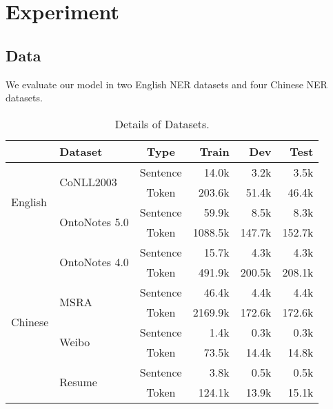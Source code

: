\documentclass[11pt,a4paper]{article}
\begin{document}
\section{Experiment}

\subsection{Data}

We evaluate our model in two English NER datasets and four Chinese NER datasets.

\begin{table}[t]\small \setlength{\tabcolsep}{2pt}
  \centering
\begin{threeparttable}
    \caption{Details of Datasets.} \label{tab:datasets_info}
    \begin{tabular}{llcrrr}
    \toprule
                             & Dataset                        & Type     & Train   & Dev    & Test   \\ \midrule
    \multirow{4}{*}{English} & \multirow{2}{*}{CoNLL2003}    & Sentence & 14.0k   & 3.2k   & 3.5k   \\
                             &                                & Token    & 203.6k  & 51.4k  & 46.4k  \\ \cline{2-6}
                             & \multirow{2}{*}{OntoNotes 5.0} & Sentence & 59.9k   & 8.5k   & 8.3k   \\
                             &                                & Token    & 1088.5k & 147.7k & 152.7k \\ \hline
    \multirow{8}{*}{Chinese} & \multirow{2}{*}{OntoNotes 4.0} & Sentence & 15.7k   & 4.3k   & 4.3k   \\
                             &                                & Token    & 491.9k  & 200.5k & 208.1k \\ \cline{2-6}
                             & \multirow{2}{*}{MSRA}          & Sentence & 46.4k   & 4.4k   & 4.4k   \\
                             &                                & Token    & 2169.9k & 172.6k & 172.6k \\ \cline{2-6}
                             & \multirow{2}{*}{Weibo}         & Sentence & 1.4k    & 0.3k   & 0.3k   \\
                             &                                & Token    & 73.5k   & 14.4k  & 14.8k  \\ \cline{2-6}
                             & \multirow{2}{*}{Resume}        & Sentence & 3.8k    & 0.5k   & 0.5k   \\
                             &                                & Token    & 124.1k  & 13.9k  & 15.1k  \\ \bottomrule
    \end{tabular}
\end{threeparttable}
\end{table}
\end{document}
